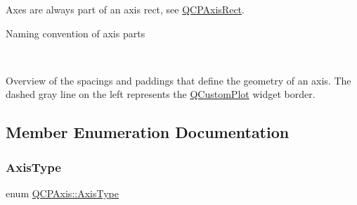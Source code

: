 Axes are always part of an axis rect, see \mbox{\hyperlink{class_q_c_p_axis_rect}{Q\+C\+P\+Axis\+Rect}}.  \begin{center}Naming convention of axis parts\end{center}  ~\newline
  \begin{center}Overview of the spacings and paddings that define the geometry of an axis. The dashed gray line on the left represents the \mbox{\hyperlink{class_q_custom_plot}{Q\+Custom\+Plot}} widget border.\end{center}  

\subsection{Member Enumeration Documentation}
\mbox{\label{class_q_c_p_axis_ae2bcc1728b382f10f064612b368bc18a}} 
\subsubsection{\texorpdfstring{Axis\+Type}{AxisType}}
{\footnotesize\ttfamily enum \mbox{\hyperlink{class_q_c_p_axis_ae2bcc1728b382f10f064612b368bc18a}{Q\+C\+P\+Axis\+::\+Axis\+Type}}}

